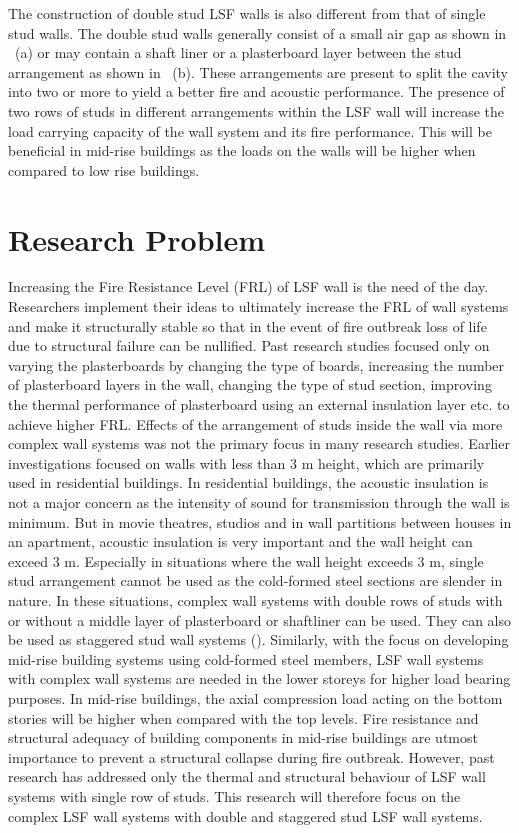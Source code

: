 The construction of double stud LSF walls is also different from that of single stud walls. The double stud walls generally consist of a small air gap as shown in ~(a) or may contain a shaft liner or a plasterboard layer between the stud arrangement as shown in ~(b). These arrangements are present to split the cavity into two or more to yield a better fire and acoustic performance. The presence of two rows of studs in different arrangements within the LSF wall will increase the load carrying capacity of the wall system and its fire performance. This will be beneficial in mid-rise buildings as the loads on the walls will be higher when compared to low rise buildings.

\section{Research Problem}

Increasing the Fire Resistance Level (FRL) of LSF wall is the need of the day. Researchers implement their ideas to ultimately increase the FRL of wall systems and make it structurally stable so that in the event of fire outbreak loss of life due to structural failure can be nullified. Past research studies focused only on varying the plasterboards by changing the type of boards, increasing the number of plasterboard layers in the wall, changing the type of stud section, improving the thermal performance of plasterboard using an external insulation layer etc. to achieve higher FRL. Effects of the arrangement of studs inside the wall via more complex wall systems was not the primary focus in many research studies. Earlier investigations focused on walls with less than 3 m height, which are primarily used in residential buildings. In residential buildings, the acoustic insulation is not a major concern as the intensity of sound for transmission through the wall is minimum. But in movie theatres, studios and in wall partitions between houses in an apartment, acoustic insulation is very important and the wall height can exceed 3 m. Especially in situations where the wall height exceeds 3 m, single stud arrangement cannot be used as the cold-formed steel sections are slender in nature. In these situations, complex wall systems with double rows of studs with or without a middle layer of plasterboard or shaftliner can be used. They can also be used as staggered stud wall systems (). Similarly, with the focus on developing mid-rise building systems using cold-formed steel members, LSF wall systems with complex wall systems are needed in the lower storeys for higher load bearing purposes. In mid-rise buildings, the axial compression load acting on the bottom stories will be higher when compared with the top levels. Fire resistance and structural adequacy of building components in mid-rise buildings are utmost importance to prevent a structural collapse during fire outbreak. However, past research has addressed only the thermal and structural behaviour of LSF wall systems with single row of studs. This research will therefore focus on the complex LSF wall systems with double and staggered stud LSF wall systems. 

